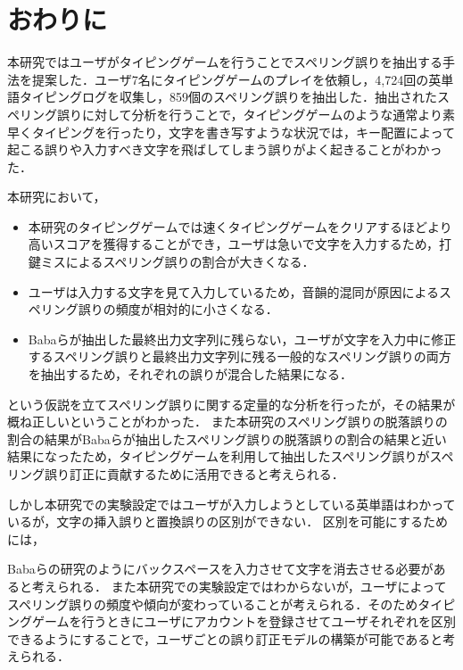 \chapter{おわりに}
本研究ではユーザがタイピングゲームを行うことでスペリング誤りを抽出する手法を提案した．ユーザ7名にタイピングゲームのプレイを依頼し，4,724回の英単語タイピングログを収集し，859個のスペリング誤りを抽出した．抽出されたスペリング誤りに対して分析を行うことで，タイピングゲームのような通常より素早くタイピングを行ったり，文字を書き写すような状況では，キー配置によって起こる誤りや入力すべき文字を飛ばしてしまう誤りがよく起きることがわかった．

本研究において，

\begin{itemize}
 \item 本研究のタイピングゲームでは速くタイピングゲームをクリアするほどより高いスコアを獲得することができ，ユーザは急いで文字を入力するため，打鍵ミスによるスペリング誤りの割合が大きくなる．
 \item ユーザは入力する文字を見て入力しているため，音韻的混同が原因によるスペリング誤りの頻度が相対的に小さくなる．
 \item Babaらが抽出した最終出力文字列に残らない，ユーザが文字を入力中に修正するスペリング誤り\cite{babaACL2012}と最終出力文字列に残る一般的なスペリング誤りの両方を抽出するため，それぞれの誤りが混合した結果になる．
\end{itemize}

\noindent
という仮説を立てスペリング誤りに関する定量的な分析を行ったが，その結果が概ね正しいということがわかった．
また本研究のスペリング誤りの脱落誤りの割合の結果がBabaらが抽出したスペリング誤りの脱落誤りの割合の結果\cite{babaACL2012}と近い結果になったため，タイピングゲームを利用して抽出したスペリング誤りがスペリング誤り訂正に貢献するために活用できると考えられる．

しかし本研究での実験設定ではユーザが入力しようとしている英単語はわかっているが，文字の挿入誤りと置換誤りの区別ができない．
区別を可能にするためには，
\begin{comment}
タイピングゲームにおいて入力した文字列が正しいかどうか判定するときにエンターキーを入力させて英単語に対応する文字列を明確にする，
\end{comment}
Babaらの研究\cite{babaACL2012}のようにバックスペースを入力させて文字を消去させる必要があると考えられる．
また本研究での実験設定ではわからないが，ユーザによってスペリング誤りの頻度や傾向が変わっていることが考えられる．そのためタイピングゲームを行うときにユーザにアカウントを登録させてユーザそれぞれを区別できるようにすることで，ユーザごとの誤り訂正モデルの構築が可能であると考えられる．


